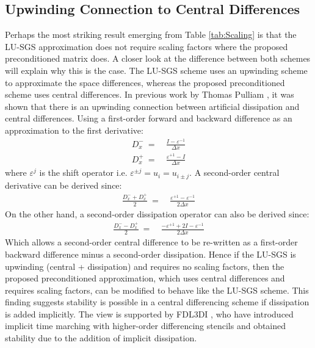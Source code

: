 \documentclass[conf]{new-aiaa}
\begin{document}
\subsection{Upwinding Connection to Central Differences}
Perhaps the most striking result emerging from Table \ref{tab:Scaling} is that the LU-SGS approximation does not require scaling factors where the proposed preconditioned matrix does. A closer look at the difference between both schemes will explain why this is the case. The LU-SGS scheme uses an upwinding scheme to approximate the space differences, whereas the proposed preconditioned scheme uses central differences. In previous work by Thomas Pulliam \cite{Pulliam_Dissipation}, it was shown that there is an upwinding connection between artificial dissipation and central differences. Using a first-order forward and backward difference as an approximation to the first derivative:
\begin{equation}
	\begin{split}
		\label{eq:}
  			D_x^-~=&~\frac{I-\varepsilon^{-1}}{\Delta{x}} \\
  			D_x^+~=&~\frac{\varepsilon^{+1}-I}{\Delta{x}}
	\end{split}
\end{equation}
where $\varepsilon^j$ is the shift operator i.e. $\varepsilon^{\pm j}=u_i=u_{i\pm j}$. A second-order central derivative can be derived since:
\begin{equation}
	\begin{split}
		\label{eq:2nd_Spatial}
  			\frac{D_x^-+D_x^+}{2}~=&~\frac{\varepsilon^{+1}-\varepsilon^{-1}}{2\Delta{x}}
 	\end{split}
\end{equation}
On the other hand, a second-order dissipation operator can also be derived since:
\begin{equation}
	\begin{split}
		\label{eq:2nd_Diss}
  			\frac{D_x^--D_x^+}{2}~=&~\frac{-\varepsilon^{+1}+2I-\varepsilon^{-1}}{2\Delta{x}}
 	\end{split}
\end{equation}
Which allows a second-order central difference to be re-written as a first-order backward difference minus a second-order dissipation.
Hence if the LU-SGS is upwinding (central + dissipation) and requires no scaling factors, then the proposed preconditioned approximation, which uses central differences and requires scaling factors, can be modified to behave like the LU-SGS scheme. 
This finding suggests stability is possible in a central differencing scheme if dissipation is added implicitly. 
The view is supported by FDL3DI \cite{FDL3DI_A, FDL3DI_B, FDL3DI_C}, who have introduced implicit time marching with higher-order differencing stencils and obtained stability due to the addition of implicit dissipation.
\end{document}

